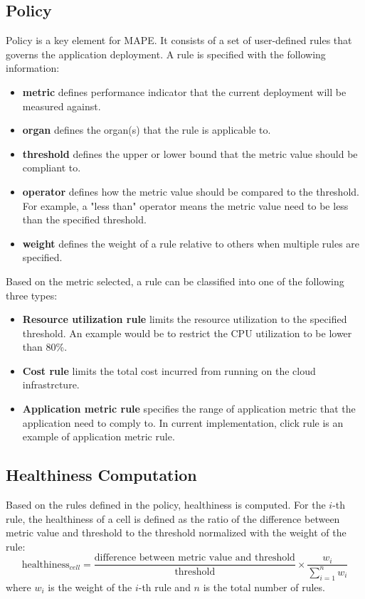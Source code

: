 \documentclass{seal_thesis}
\begin{document}
\subsection{Policy}
Policy is a key element for MAPE.
It consists of a set of user-defined rules that governs the application deployment.
A rule is specified with the following information:
\begin{itemize}
\item \textbf{metric} defines performance indicator that the current deployment will be measured against.
\item \textbf{organ} defines the organ(s) that the rule is applicable to.
\item \textbf{threshold} defines the upper or lower bound that the metric value should be compliant to.
\item \textbf{operator} defines how the metric value should be compared to the threshold.
For example, a "less than" operator means the metric value need to be less than the specified threshold.
\item \textbf{weight} defines the weight of a rule relative to others when multiple rules are specified.
\end{itemize}
Based on the metric selected, a rule can be classified into one of the following three types:
\begin{itemize}
\item \textbf{Resource utilization rule} limits the resource utilization to the specified threshold.
An example would be to restrict the CPU utilization to be lower than 80\%.
\item \textbf{Cost rule} limits the total cost incurred from running on the cloud infrastrcture.
\item \textbf{Application metric rule} specifies the range of application metric that the application need to comply to.
In current implementation, click rule is an example of application metric rule.
\end{itemize}

\subsection{Healthiness Computation}
Based on the rules defined in the policy, healthiness is computed.
For the $i$-th rule, the healthiness of a cell is defined as the ratio of the difference between metric value and threshold to the threshold normalized with the weight of the rule:
\[ \textrm{healthiness}_{cell} = \frac{\textrm{difference between metric value and threshold}}{\textrm{threshold}} \times \frac{w_i}{\sum_{i=1}^{n}{w_i}}\]
where $w_i$ is the weight of the $i$-th rule and $n$ is the total number of rules.
\end{document}
